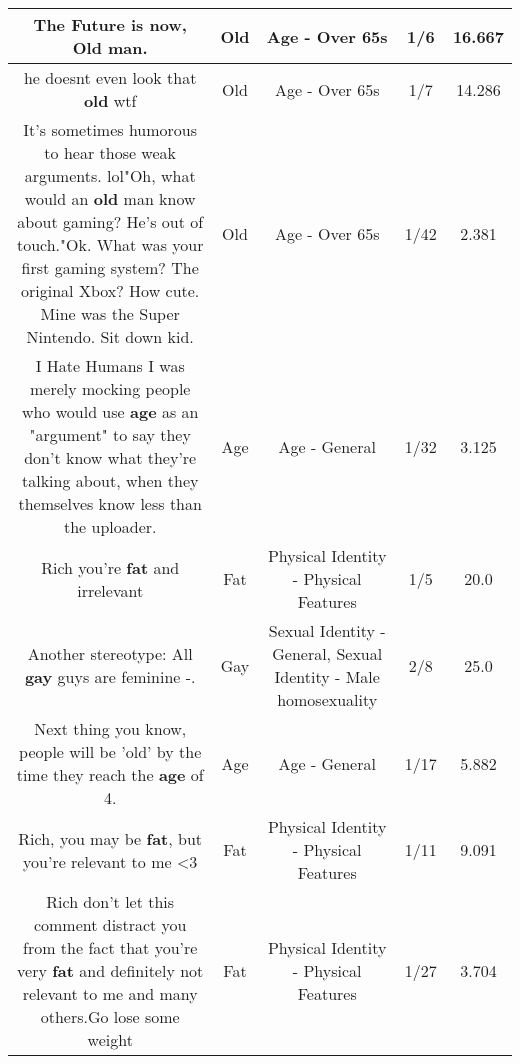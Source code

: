 \documentclass[11pt]{article}
\newlength\mylength
\begin{document}
\begin{center}
\begin{longtable}{|C{.65\mylength}|C{.30\mylength}|C{.12\mylength}|C{.12\mylength}|C{.12\mylength}|}
  \small The Future is now, \textbf{Old} man.\normalsize   & Old & Age - Over 65s & 1/6 & 16.667 \\  \hline
  \small he doesnt even look that \textbf{old} wtf\normalsize   & Old & Age - Over 65s & 1/7 & 14.286 \\  \hline
  \small It's sometimes humorous to hear those weak arguments. lol"Oh, what would an \textbf{old} man know about gaming? He's out of touch."Ok. What was your first gaming system? The original Xbox? How cute. Mine was the Super Nintendo. Sit down kid.\normalsize   & Old & Age - Over 65s & 1/42 & 2.381 \\  \hline
  \small I Hate Humans I was merely mocking people who would use \textbf{age} as an "argument" to say they don't know what they're talking about, when they themselves know less than the uploader.\normalsize   & Age & Age - General & 1/32 & 3.125 \\  \hline
  \small Rich you're \textbf{fat} and irrelevant\normalsize   & Fat & Physical Identity - Physical Features & 1/5 & 20.0 \\  \hline
  \small Another stereotype: All \textbf{g\textbf{ay}} guys are feminine -.\normalsize   & Gay & Sexual Identity - General, Sexual Identity - Male homosexuality & 2/8 & 25.0 \\  \hline
  \small Next thing you know, people will be 'old' by the time they reach the \textbf{age} of 4.\normalsize   & Age & Age - General & 1/17 & 5.882 \\  \hline
  \small Rich, you may be \textbf{fat}, but you're relevant to me <3\normalsize   & Fat & Physical Identity - Physical Features & 1/11 & 9.091 \\  \hline
  \small Rich don't let this comment distract you from the fact that you're very \textbf{fat} and definitely not relevant to me and many others.Go lose some weight\normalsize   & Fat & Physical Identity - Physical Features & 1/27 & 3.704 \\  \hline

\end{longtable}
\end{center}
\end{document}
